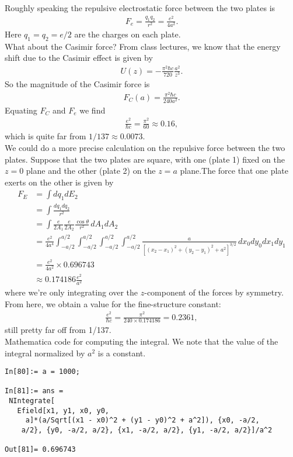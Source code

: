 \documentclass{article}
\theoremstyle{definition}
\newcommand{\f}[2]{\frac{#1}{#2}}
\begin{document}
\noindent Roughly speaking the repulsive electrostatic force between the two plates is 
\begin{align*}
F_e = \f{q_1 q_2}{r^2} =  \f{e^2}{4 a^2}. 
\end{align*}
Here $q_1 = q_2 = e/2 $ are the charges on each plate. \\

\noindent What about the Casimir force? From class lectures, we know that the energy shift due to the Casimir effect is given by 
\begin{align*}
U(z) = -\f{\pi^2 \hbar c}{720 } \f{a^2 }{z^3}.
\end{align*}
So the magnitude of the Casimir force is 
\begin{align*}
F_C(a) =  \f{\pi^2 \hbar c }{240 a^2}.
\end{align*}
Equating $F_C$ and $F_e$ we find 
\begin{align*}
\f{e^2}{\hbar c} = \f{\pi^2}{60} \approx 0.16, 
\end{align*}
which is quite far from $1/137 \approx 0.0073$. \\


We could do a more precise calculation on the repulsive force between the two plates. Suppose that the two plates are square, with one (plate 1) fixed on the $z=0$ plane and the other (plate 2) on the $z=a$ plane.The force that one plate exerts on the other is given by
\begin{align*}
F_E 
&= \int dq_1 dE_2 \\
&= \int \f{dq_1 dq_2}{r^2} \\
&= \int \f{e}{2A_1} \f{e}{2A_2 }  \f{\cos\theta}{r^2}  \, dA_1  dA_2 \\
&= \f{e^2}{4a^4} \int_{-a/2}^{a/2}\int_{-a/2}^{a/2}\int_{-a/2}^{a/2}\int_{-a/2}^{a/2} \f{a}{ [ (x_2 - x_1)^2 + (y_2 - y_1)^2 + a^2 ]^{3/2}} \, dx_0 dy_0 dx_1 dy_1 \\
&= \f{e^2}{4a^2} \times 0.696743  \\
&\approx 0.174186 \f{e^2}{a^2}
\end{align*}
where we're only integrating over the $z$-component of the forces by symmetry. From here, we obtain a value for the fine-structure constant:
\begin{align*}
\f{e^2}{\hbar c} = \f{\pi^2}{240 \times 0.174186 }  =  0.2361,
\end{align*}
still pretty far off from 1/137. \\


\noindent Mathematica code for computing the integral. We note that the value of the integral normalized by $a^2$ is a constant. 
\begin{lstlisting}
In[80]:= a = 1000;

In[81]:= ans = 
 NIntegrate[
   Efield[x1, y1, x0, y0, 
     a]*(a/Sqrt[(x1 - x0)^2 + (y1 - y0)^2 + a^2]), {x0, -a/2, 
    a/2}, {y0, -a/2, a/2}, {x1, -a/2, a/2}, {y1, -a/2, a/2}]/a^2

Out[81]= 0.696743
\end{lstlisting}
\end{document}
